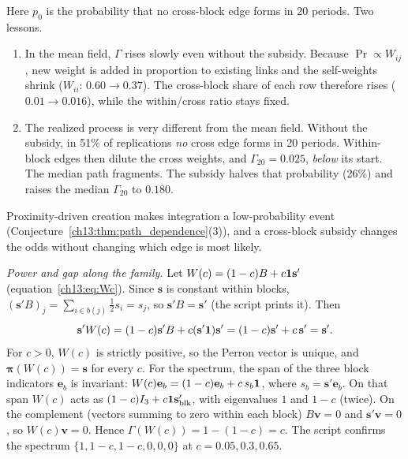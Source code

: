 \documentclass[../solutions_manual.tex]{subfiles}
\begin{document}
Here $p_0$ is the probability that no cross-block edge forms in 20 periods. Two lessons.
\begin{enumerate}
\item In the mean field, $\Gamma$ rises slowly even without the subsidy. Because $\Pr \propto W_{ij}$, new weight is added in proportion to existing links and the self-weights shrink ($W_{ii}$: $0.60 \to 0.37$). The cross-block share of each row therefore rises ($0.01 \to 0.016$), while the within/cross ratio stays fixed.
\item The realized process is very different from the mean field. Without the subsidy, in 51\% of replications \emph{no} cross edge forms in 20 periods. Within-block edges then dilute the cross weights, and $\Gamma_{20} = 0.025$, \emph{below} its start. The median path fragments. The subsidy halves that probability (26\%) and raises the median $\Gamma_{20}$ to $0.180$.
\end{enumerate}
Proximity-driven creation makes integration a low-probability event (Conjecture~\ref{ch13:thm:path_dependence}(3)), and a cross-block subsidy changes the odds without changing which edge is most likely.

 \emph{Power and gap along the family.} Let $W(c) = (1-c)B + c\mathbf{1}\mathbf{s}'$ (equation~\eqref{ch13:eq:Wc}). Since $\mathbf{s}$ is constant within blocks, $(\mathbf{s}'B)_j = \sum_{i \in b(j)}\tfrac12 s_i = s_j$, so $\mathbf{s}'B = \mathbf{s}'$ (the script prints it). Then
\[
\mathbf{s}'W(c) = (1-c)\mathbf{s}'B + c(\mathbf{s}'\mathbf{1})\mathbf{s}' = (1-c)\mathbf{s}' + c\,\mathbf{s}' = \mathbf{s}'.
\]
For $c > 0$, $W(c)$ is strictly positive, so the Perron vector is unique, and $\boldsymbol{\pi}(W(c)) = \mathbf{s}$ for every $c$. For the spectrum, the span of the three block indicators $\mathbf{e}_b$ is invariant: $W(c)\mathbf{e}_b = (1-c)\mathbf{e}_b + c\,s_b\mathbf{1}$, where $s_b = \mathbf{s}'\mathbf{e}_b$. On that span $W(c)$ acts as $(1-c)I_3 + c\mathbf{1}\mathbf{s}_{\text{blk}}'$, with eigenvalues $1$ and $1-c$ (twice). On the complement (vectors summing to zero within each block) $B\mathbf{v} = 0$ and $\mathbf{s}'\mathbf{v} = 0$, so $W(c)\mathbf{v} = 0$. Hence $\Gamma(W(c)) = 1 - (1-c) = c$. The script confirms the spectrum $\{1, 1-c, 1-c, 0, 0, 0\}$ at $c = 0.05, 0.3, 0.65$.
\end{document}
